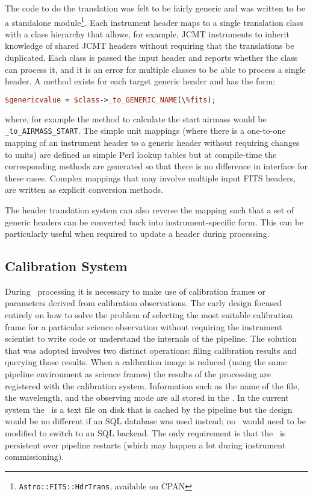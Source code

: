 \documentclass[final,authoryear,5p,times,twocolumn]{elsarticle}
\begin{document}
The code to do the translation was felt to be fairly generic and was
written to be a standalone
module\footnote{\texttt{Astro::FITS::HdrTrans}, available on
  CPAN}. Each instrument header maps to a single translation class
with a class hierarchy that allows, for example, JCMT instruments to
inherit knowledge of shared JCMT headers without requiring that the
translations be duplicated. Each class is passed the input header and
reports whether the class can process it, and it is an error for multiple
classes to be able to process a single header. A method exists for each
target generic header and has the form:

\begin{lstlisting}[language=perl]
$genericvalue = $class->_to_GENERIC_NAME(\%fits);
\end{lstlisting}

where, for example the method to calculate the start airmass would be
\texttt{\_to\_AIRMASS\_START}. The simple unit mappings (where there
is a one-to-one mapping of an instrument header to a generic header
without requiring changes to units) are defined as simple Perl lookup tables
but at compile-time the corresponding methods are generated so that
there is no difference in interface for these cases. Complex mappings
that may involve multiple input FITS headers, are written as explicit
conversion methods.

The header translation system can also reverse the mapping such that a
set of generic headers can be converted back into instrument-specific
form. This can be particularly useful when required to update a header
during processing.

\subsection{Calibration System}

During \Frame\ processing it is necessary to make use of calibration
frames or parameters derived from calibration observations. The early
design focused entirely on how to solve the problem of selecting the
most suitable calibration frame for a particular science observation
without requiring the instrument scientist to write code or understand
the internals of the pipeline. The solution that was adopted involves
two distinct operations: filing calibration results and querying those results.
When a calibration image is reduced (using the same pipeline
environment as science frames) the results of the processing are
registered with the calibration system. Information such as the name
of the file, the wavelength, and the observing mode are all stored in the \Index.
In the current system the \Index\ is a text file on disk that is cached by
the pipeline but the design would be no different if an SQL database
was used instead; no \primitives\ would need to be modified to switch
to an SQL backend.  The only requirement is that the \Index\ is
persistent over pipeline restarts (which may happen a lot during
instrument commissioning).
\end{document}
